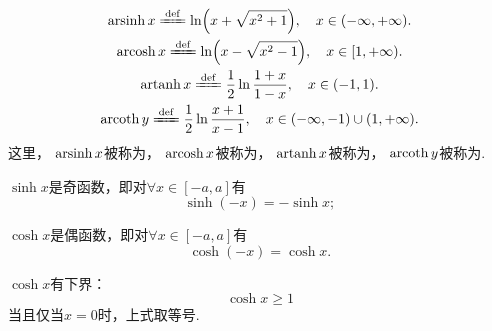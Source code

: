 \begin{definition}[反双曲函数]
\begin{gather}
	\arsinh x \defeq \ln(x + \sqrt{x^2 + 1}), \quad x \in (-\infty,+\infty). \\
	\arcosh x \defeq \ln(x - \sqrt{x^2 - 1}), \quad x \in [1,+\infty). \\
	\artanh x \defeq \frac{1}{2} \ln\frac{1 + x}{1 - x}, \quad x \in (-1,1). \\
	\arcoth y \defeq \frac{1}{2} \ln\frac{x + 1}{x - 1}, \quad x \in (-\infty,-1) \cup (1,+\infty).
\end{gather}
这里，
\(\operatorname{arsinh} x\)被称为，
\(\operatorname{arcosh} x\)被称为，
\(\operatorname{artanh} x\)被称为，
\(\operatorname{arcoth} y\)被称为.
\end{definition}

\begin{property}
\(\sinh x\)是奇函数，即对\(\forall x \in [-a,a]\)有\[
\sinh(-x) = -\sinh x;
\]

\(\cosh x\)是偶函数，即对\(\forall x \in [-a,a]\)有\[
\cosh(-x) = \cosh x.
\]
\end{property}

\begin{property}
\(\cosh x\)有下界：\[
\cosh x \geq 1
\]当且仅当\(x=0\)时，上式取等号.
\end{property}

